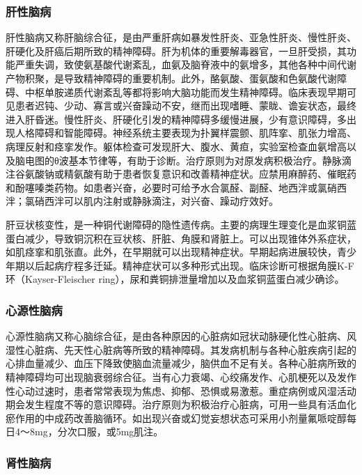 \subsubsection{肝性脑病}

肝性脑病又称肝脑综合征，是由严重肝病如暴发性肝炎、亚急性肝炎、慢性肝炎、肝硬化及肝癌后期所致的精神障碍。肝为机体的重要解毒器官，一旦肝受损，其功能严重失调，致使氨基酸代谢紊乱，血氨及脑脊液中的氨增多，其他各种中间代谢产物积聚，是导致精神障碍的重要机制。此外，酪氨酸、蛋氨酸和色氨酸代谢障碍、中枢单胺递质代谢紊乱等都将影响大脑功能而发生精神障碍。临床表现早期可见患者迟钝、少动、寡言或兴奋躁动不安，继而出现嗜睡、蒙眬、谵妄状态，最终进入肝昏迷。慢性肝炎、肝硬化引发的精神障碍多缓慢进展，少有意识障碍，多出现人格障碍和智能障碍。神经系统主要表现为扑翼样震颤、肌阵挛、肌张力增高、病理反射和痉挛发作。躯体检查可发现肝大、腹水、黄疸，实验室检查血氨增高以及脑电图的θ波基本节律等，有助于诊断。治疗原则为对原发病积极治疗。静脉滴注谷氨酸钠或精氨酸有助于患者恢复意识和改善精神症状。应禁用麻醉药、催眠药和酚噻嗪类药物。如患者兴奋，必要时可给予水合氯醛、副醛、地西泮或氯硝西泮；氯硝西泮可以肌内注射或静脉滴注，对兴奋、躁动疗效好。

肝豆状核变性，是一种铜代谢障碍的隐性遗传病。主要的病理生理变化是血浆铜蓝蛋白减少，导致铜沉积在豆状核、肝脏、角膜和肾脏上。可以出现锥体外系症状，如肌痉挛和肌张直。此外，在早期就可以出现精神症状。早期起病进展较快，青少年期以后起病疗程多迁延。精神症状可以多种形式出现。临床诊断可根据角膜K-F环（Kayser-Fleischer
ring），尿和粪铜排泄量增加以及血浆铜蓝蛋白减少确诊。

\subsubsection{心源性脑病}

心源性脑病又称心脑综合征，是由各种原因的心脏病如冠状动脉硬化性心脏病、风湿性心脏病、先天性心脏病等所致的精神障碍。其发病机制与各种心脏疾病引起的心排血量减少、血压下降致使脑血流量减少，脑供血不足有关。各种心脏病所致的精神障碍均可出现脑衰弱综合征。当有心力衰竭、心绞痛发作、心肌梗死以及发作性心动过速时，患者常常表现为焦虑、抑郁、恐惧或易激惹。重症病例或风湿活动期会发生程度不等的意识障碍。治疗原则为积极治疗心脏病，可用一些具有活血化瘀作用的中成药改善脑循环。如出现兴奋或幻觉妄想状态可采用小剂量氟哌啶醇每日4～8mg，分次口服，或5mg肌注。

\subsubsection{肾性脑病}

